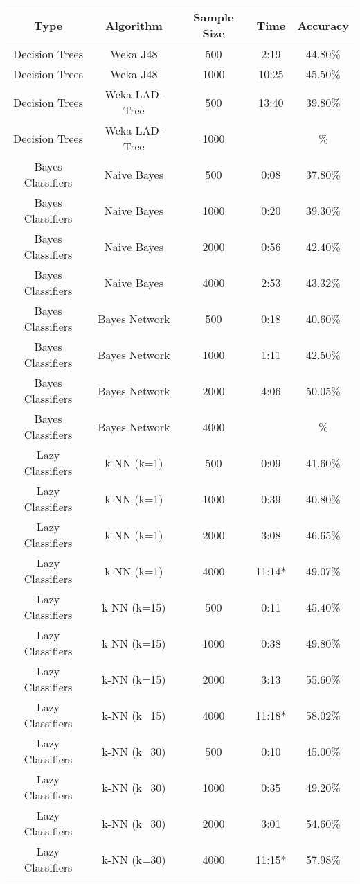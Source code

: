 \begin{tabular}{|c|c|c|c|c|}
\hline
Type     &       Algorithm    & Sample Size &  Time &  Accuracy   \\
\hline
\hline
Decision Trees & Weka J48      &   500  &   2:19  &    44.80\%  \\
Decision Trees & Weka J48      &  1000  &  10:25  &    45.50\%  \\
Decision Trees & Weka LAD-Tree &   500  &  13:40  &    39.80\%  \\
Decision Trees & Weka LAD-Tree &  1000  &         &         \%  \\

Bayes Classifiers & Naive Bayes &   500  &   0:08  &    37.80\%  \\
Bayes Classifiers & Naive Bayes &  1000  &   0:20  &    39.30\%  \\
Bayes Classifiers & Naive Bayes &  2000  &   0:56  &    42.40\%  \\
Bayes Classifiers & Naive Bayes &  4000  &   2:53  &    43.32\%  \\

Bayes Classifiers & Bayes Network &   500  &  0:18  &   40.60\%  \\
Bayes Classifiers & Bayes Network &  1000  &  1:11  &   42.50\%  \\
Bayes Classifiers & Bayes Network &  2000  &  4:06  &   50.05\%  \\
Bayes Classifiers & Bayes Network &  4000  &    &   \%  \\

Lazy Classifiers & k-NN (k=1) &   500  &   0:09  &    41.60\%  \\
Lazy Classifiers & k-NN (k=1) &  1000  &   0:39  &    40.80\%  \\
Lazy Classifiers & k-NN (k=1) &  2000  &   3:08  &    46.65\%  \\
Lazy Classifiers & k-NN (k=1) &  4000  &  11:14* &    49.07\%  \\

Lazy Classifiers & k-NN (k=15) &   500  &   0:11  &    45.40\%  \\
Lazy Classifiers & k-NN (k=15) &  1000  &   0:38  &    49.80\%  \\
Lazy Classifiers & k-NN (k=15) &  2000  &   3:13  &    55.60\%  \\
Lazy Classifiers & k-NN (k=15) &  4000  &  11:18* &    58.02\%  \\

Lazy Classifiers & k-NN (k=30) &   500  &   0:10  &    45.00\%  \\
Lazy Classifiers & k-NN (k=30) &  1000  &   0:35  &    49.20\%  \\
Lazy Classifiers & k-NN (k=30) &  2000  &   3:01  &    54.60\%  \\
Lazy Classifiers & k-NN (k=30) &  4000  &  11:15* &    57.98\%  \\


\end{tabular}
